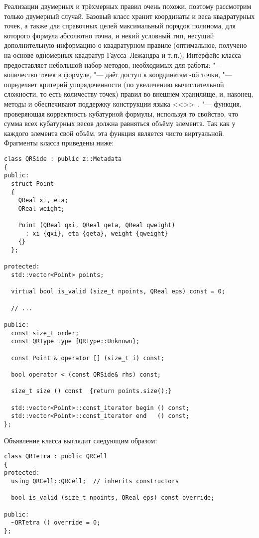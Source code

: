Реализации двумерных и трёхмерных правил очень похожи, поэтому рассмотрим только двумерный случай. Базовый класс  хранит координаты и веса квадратурных точек, а также для справочных целей максимальный порядок полинома, для которого формула абсолютно точна, и некий условный тип, несущий дополнительную информацию о квадратурном правиле (оптимальное, получено на основе одномерных квадратур Гаусса--Лежандра и т.\,п.). Интерфейс класса предоставляет небольшой набор методов, необходимых для работы:  "--- количество точек в формуле,  "--- даёт доступ к координатам -ой точки,  "--- определяет критерий упорядоченности (по увеличению вычислительной сложности, то есть количеству точек) правил во внешнем хранилище, и, наконец, методы  и  обеспечивают поддержку конструкции языка  <<>>~\cite{Stroustrup:2013:en}.  "--- функция, проверяющая корректность кубатурной формулы, используя то свойство, что сумма всех кубатурных весов должна равняться объёму элемента. Так как у каждого элемента свой объём, эта функция является чисто виртуальной. Фрагменты класса приведены ниже:

\begin{verbatim}
class QRSide : public z::Metadata
{
public:
  struct Point
  {
    QReal xi, eta;
    QReal weight;

    Point (QReal qxi, QReal qeta, QReal qweight)
      : xi {qxi}, eta {qeta}, weight {qweight}
    {}
  };

protected:
  std::vector<Point> points;

  virtual bool is_valid (size_t npoints, QReal eps) const = 0;

  // ...

public:
  const size_t order;
  const QRType type {QRType::Unknown};

  const Point & operator [] (size_t i) const;

  bool operator < (const QRSide& rhs) const;

  size_t size () const  {return points.size();}

  std::vector<Point>::const_iterator begin () const;
  std::vector<Point>::const_iterator end   () const;
};
\end{verbatim}

\noindent
Объявление класса  выглядит следующим образом:

\begin{verbatim}
class QRTetra : public QRCell
{
protected:
  using QRCell::QRCell;  // inherits constructors

  bool is_valid (size_t npoints, QReal eps) const override;

public:
  ~QRTetra () override = 0;
};
\end{verbatim}

